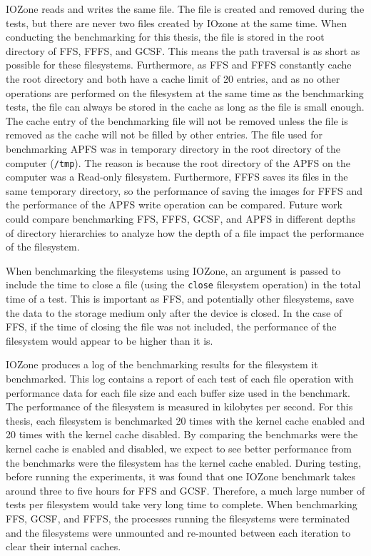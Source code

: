IOZone reads and writes the same file. The file is created and removed during the tests, but there are never two files created by IOzone at the same time. When conducting the benchmarking for this thesis, the file is stored in the root directory of \gls{FFS}, \gls{FFFS}, and \gls{GCSF}. This means the path traversal is as short as possible for these filesystems. Furthermore, as \gls{FFS} and \gls{FFFS} constantly cache the root directory and both have a cache limit of 20 entries, and as no other operations are performed on the filesystem at the same time as the benchmarking tests, the file can always be stored in the cache as long as the file is small enough. The cache entry of the benchmarking file will not be removed unless the file is removed as the cache will not be filled by other entries. The file used for benchmarking \gls{APFS} was in temporary directory in the root directory of the computer (\texttt{/tmp}). The reason is because the root directory of the \gls{APFS} on the computer was a \mbox{Read-only} filesystem. Furthermore, \gls{FFFS} saves its files in the same temporary directory, so the performance of saving the images for \gls{FFFS} and the performance of the \gls{APFS} write operation can be compared. Future work could compare benchmarking \gls{FFS}, \gls{FFFS}, \gls{GCSF}, and \gls{APFS} in different depths of directory hierarchies to analyze how the depth of a file impact the performance of the filesystem.

When benchmarking the filesystems using IOZone, an argument is passed to include the time to close a file (using the \texttt{close} filesystem operation) in the total time of a test. This is important as \gls{FFS}, and potentially other filesystems, save the data to the storage medium only after the device is closed. In the case of \gls{FFS}, if the time of closing the file was not included, the performance of the filesystem would appear to be higher than it is.

IOZone produces a log of the benchmarking results for the filesystem it benchmarked. This log contains a report of each test of each file operation with performance data for each file size and each buffer size used in the benchmark. The performance of the filesystem is measured in kilobytes per second. For this thesis, each filesystem is benchmarked 20 times with the kernel cache enabled and 20 times with the kernel cache disabled. By comparing the benchmarks were the kernel cache is enabled and disabled, we expect to see better performance from the benchmarks were the filesystem has the kernel cache enabled. During testing, before running the experiments, it was found that one IOZone benchmark takes around three to five hours for \gls{FFS} and \gls{GCSF}. Therefore, a much large number of tests per filesystem would take very long time to complete. When benchmarking \gls{FFS}, \gls{GCSF}, and \gls{FFFS}, the processes running the filesystems were terminated and the filesystems were unmounted and \mbox{re-mounted} between each iteration to clear their internal caches.

